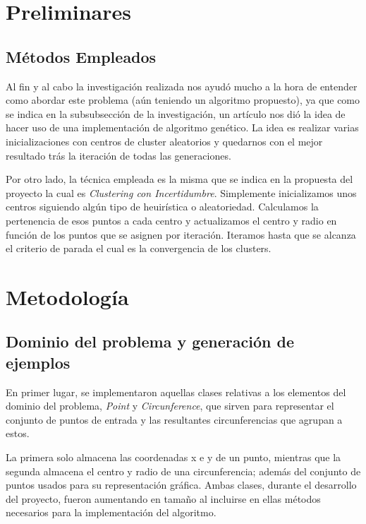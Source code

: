 \documentclass[conference,a4paper]{IEEEtran}
\begin{document}

\clearpage
\section{Preliminares}

\subsection{Métodos Empleados}

Al fin y al cabo la investigación realizada nos ayudó mucho a la hora de entender como abordar este problema (aún teniendo un algoritmo propuesto), ya que como se indica en la subsubsección de la investigación, un artículo nos dió la idea de hacer uso de una implementación de algoritmo genético. La idea es realizar varias inicializaciones con centros de cluster aleatorios y quedarnos con el mejor resultado trás la iteración de todas las generaciones.

Por otro lado, la técnica empleada es la misma que se indica en la propuesta del proyecto la cual es \textit{Clustering con Incertidumbre}. Simplemente inicializamos unos centros siguiendo algún tipo de heuirística o aleatoriedad. Calculamos la pertenencia de esos puntos a cada centro y actualizamos el centro y radio en función de los puntos que se asignen por iteración. Iteramos hasta que se alcanza el criterio de parada el cual es la convergencia de los clusters.

\section{Metodología}

\subsection{Dominio del problema y generación de ejemplos}

En primer lugar, se implementaron aquellas clases relativas a los elementos del dominio del problema, \textit{Point} y \textit{Circunference}, que sirven para representar el conjunto de puntos de entrada y las resultantes circunferencias que agrupan a estos.

La primera solo almacena las coordenadas x e y de un punto, mientras que la segunda almacena el centro y radio de una circunferencia; además del conjunto de puntos usados para su representación gráfica. Ambas clases, durante el desarrollo del proyecto, fueron aumentando en tamaño al incluirse en ellas métodos necesarios para la implementación del algoritmo.
\end{document}
